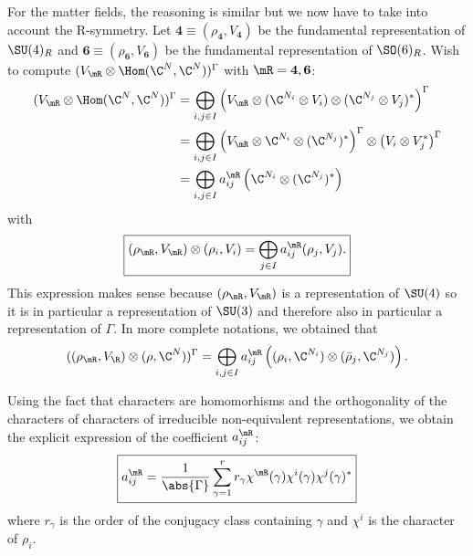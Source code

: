 \documentclass{worksheetclass}
\begin{document}
            For the matter fields, the reasoning is similar but we now have to take into account the R-symmetry. Let $\boldsymbol{4}\equiv(\rho_{\boldsymbol{4}},V_{\boldsymbol{4}})$ be the fundamental representation of $\SU(4)_R$ and $\boldsymbol{6}\equiv(\rho_{\boldsymbol{6}},V_{\boldsymbol{6}})$ be the fundamental representation of $\SO(6)_R$. Wish to compute $(V_\mR\otimes\Hom(\C^N,\C^N))^\Gamma$ with $\mR=\boldsymbol{4},\boldsymbol{6}$:
            \begin{align}
                (V_\mR\otimes\Hom(\C^N,\C^N))^\Gamma &= \bigoplus_{i,j\in I} \left(V_\mR\otimes (\C^{N_i}\otimes V_i)\otimes(\C^{N_j}\otimes V_j)^*\right)^\Gamma\\
                &= \bigoplus_{i,j\in I} \left(V_\mR\otimes\C^{N_i}\otimes(\C^{N_j})^*\right)^\Gamma\otimes\left(V_i\otimes V^*_j\right)^\Gamma\\
                &= \bigoplus_{i,j\in I}a^\mR_{ij}\left(\C^{N_i}\otimes(\C^{N_j})^*\right)
            \end{align}
            with
            \begin{equation}
                \boxed{(\rho_\mR,V_\mR)\otimes(\rho_i,V_i)=\bigoplus_{j\in I}a^\mR_{ij}(\rho_j,V_j).}\label{eq:defaij}
            \end{equation}
            This expression makes sense because $(\rho_\mR,V_\mR)$ is a representation of $\SU(4)$ so it is in particular a representation of $\SU(3)$ and therefore also in particular a representation of $\Gamma$. In more complete notations, we obtained that
            \begin{equation}
                ((\rho_\mR,V_\R)\otimes(\rho,\C^N))^\Gamma = \bigoplus_{i,j\in I}a^\mR_{ij}\left((\rho_i,\C^{N_i})\otimes(\bar{\rho}_j,\C^{N_j})\right).\label{eq:resdecomp}
            \end{equation}
            

            Using the fact that characters are homomorhisms and the orthogonality of the characters of characters of irreducible non-equivalent representations, we obtain the explicit expression of the coefficient $a^\mR_{ij}$:
            \begin{equation}
                \boxed{a^\mR_{ij} = \frac{1}{\abs{\Gamma}}\sum^r_{\gamma=1} r_\gamma\chi^\mR(\gamma)\chi^i(\gamma)\chi^j(\gamma)^*}\label{eq:aij}
            \end{equation}
            where $r_\gamma$ is the order of the conjugacy class containing $\gamma$ and $\chi^i$ is the character of $\rho_i$.
\end{document}
